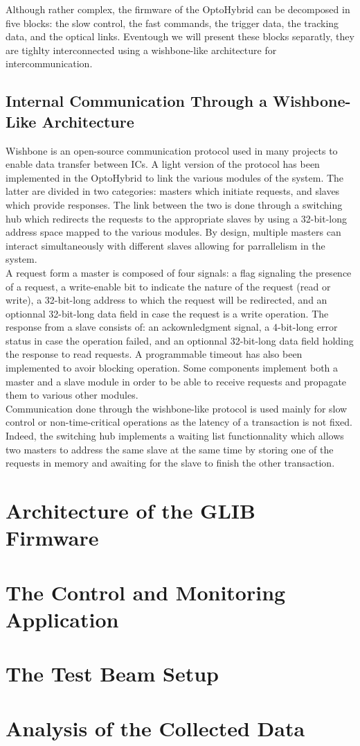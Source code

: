     Although rather complex, the firmware of the OptoHybrid can be decomposed in five blocks: the slow control, the fast commands, the trigger data, the tracking data, and the optical links. Eventough we will present these blocks separatly, they are tighlty interconnected using a wishbone-like architecture for intercommunication.

    \subsection{Internal Communication Through a Wishbone-Like Architecture}

      Wishbone is an open-source communication protocol used in many projects to enable data transfer between ICs. A light version of the protocol has been implemented in the OptoHybrid to link the various modules of the system. The latter are divided in two categories: masters which initiate requests, and slaves which provide responses. The link between the two is done through a switching hub which redirects the requests to the appropriate slaves by using a 32-bit-long address space mapped to the various modules. By design, multiple masters can interact simultaneously with different slaves allowing for parrallelism in the system. \\

      A request form a master is composed of four signals: a flag signaling the presence of a request, a write-enable bit to indicate the nature of the request (read or write), a 32-bit-long address to which the request will be redirected, and an optionnal 32-bit-long data field in case the request is a write operation. The response from a slave consists of: an ackownledgment signal, a 4-bit-long error status in case the operation failed, and an optionnal 32-bit-long data field holding the response to read requests. A programmable timeout has also been implemented to avoir blocking operation. Some components implement both a master and a slave module in order to be able to receive requests and propagate them to various other modules. \\

      Communication done through the wishbone-like protocol is used mainly for slow control or non-time-critical operations as the latency of a transaction is not fixed. Indeed, the switching hub implements a waiting list functionnality which allows two masters to address the same slave at the same time by storing one of the requests in memory and awaiting for the slave to finish the other transaction.

  \section{Architecture of the GLIB Firmware}

  \section{The Control and Monitoring Application}

  \section{The Test Beam Setup}

  \section{Analysis of the Collected Data}
